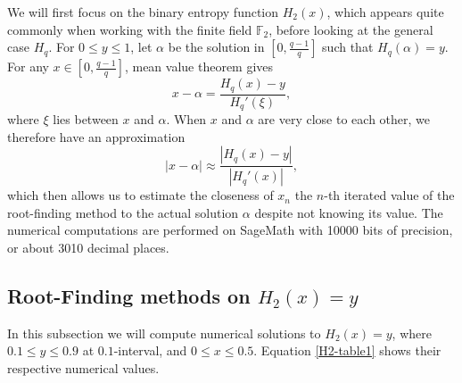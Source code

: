 \documentclass{article}
\begin{document}
We will first focus on the binary entropy function $H_{2}(x)$, which appears quite commonly when working with the finite field $\mathbb{F}_{2}$, before looking at the general case $H_{q}$. For $0\leq y \leq 1$, let $\alpha$ be the solution in $\left[0,\frac{q-1}{q}\right]$ such that $H_{q}(\alpha)=y$. For any $x\in \left[0,\frac{q-1}{q}\right]$, mean value theorem gives
\[
x-\alpha = \frac{H_{q}(x)-y}{H_{q}'(\xi)}, 
\]
where $\xi$ lies between $x$ and $\alpha$. When $x$ and $\alpha$ are very close to each other, we therefore have an approximation 
\begin{equation}\label{x-alpha}
|x-\alpha|\approx \frac{\left|H_{q}(x)-y\right|}{\left|H_{q}'(x)\right|},
\end{equation}
which then allows us to estimate the closeness of $x_{n}$ the $n$-th iterated value of the root-finding method to the actual solution $\alpha$ despite not knowing its value. The numerical computations are performed on SageMath with 10000 bits of precision, or about 3010 decimal places. 


\subsection{Root-Finding methods on $H_{2}(x)=y$}

In this subsection we will compute numerical solutions to $H_{2}(x)=y$, where $0.1\leq y\leq 0.9$ at $0.1$-interval, and $0\leq x\leq 0.5$. Equation \ref{H2-table1} shows their respective numerical values. 
\end{document}
